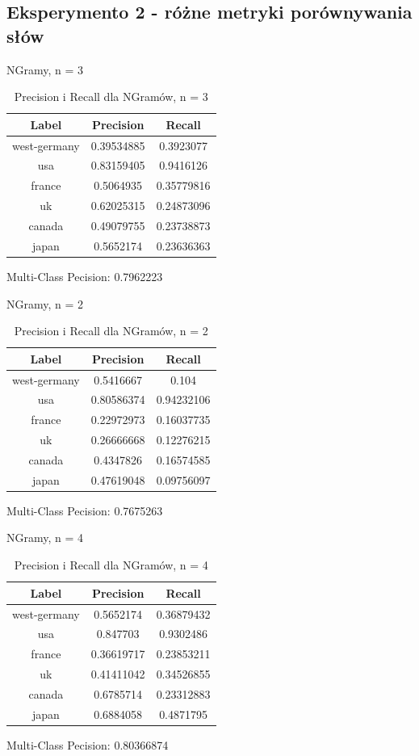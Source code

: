 \documentclass{classrep}
\begin{document}
\subsection{Eksperymento 2 - różne metryki porównywania słów}
NGramy, n = 3
\begin{table}[H]
\begin{tabular}{|c|c|c|}
\hline
Label        & Precision  & Recall     \\ \hline
west-germany & 0.39534885 & 0.3923077  \\ \hline
usa          & 0.83159405 & 0.9416126  \\ \hline
france       & 0.5064935  & 0.35779816 \\ \hline
uk           & 0.62025315 & 0.24873096 \\ \hline
canada       & 0.49079755 & 0.23738873 \\ \hline
japan        & 0.5652174  & 0.23636363 \\ \hline
\end{tabular}
\caption{Precision i Recall dla NGramów, n = 3}
\end{table}
Multi-Class Pecision: 0.7962223

NGramy, n = 2
\begin{table}[H]
\begin{tabular}{|c|c|c|}
\hline
Label        & Precision  & Recall     \\ \hline
west-germany & 0.5416667  & 0.104      \\ \hline
usa          & 0.80586374 & 0.94232106 \\ \hline
france       & 0.22972973 & 0.16037735 \\ \hline
uk           & 0.26666668 & 0.12276215 \\ \hline
canada       & 0.4347826  & 0.16574585 \\ \hline
japan        & 0.47619048 & 0.09756097 \\ \hline
\end{tabular}
\caption{Precision i Recall dla NGramów, n = 2}
\end{table}
Multi-Class Pecision: 0.7675263

NGramy, n = 4
\begin{table}[H]
\begin{tabular}{|c|c|c|}
\hline
Label        & Precision  & Recall     \\ \hline
west-germany & 0.5652174  & 0.36879432 \\ \hline
usa          & 0.847703   & 0.9302486  \\ \hline
france       & 0.36619717 & 0.23853211 \\ \hline
uk           & 0.41411042 & 0.34526855 \\ \hline
canada       & 0.6785714  & 0.23312883 \\ \hline
japan        & 0.6884058  & 0.4871795  \\ \hline
\end{tabular}
\caption{Precision i Recall dla NGramów, n = 4}
\end{table}
Multi-Class Pecision: 0.80366874
\end{document}
